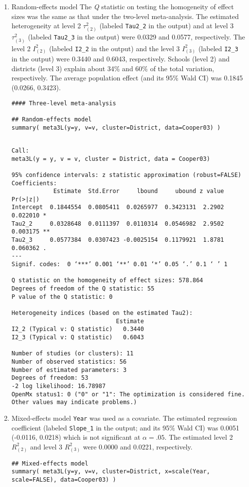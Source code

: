 \documentclass[11pt]{article}
\begin{document}
\begin{enumerate}
\item Random-effects model
\label{sec:org0d6bb7a}
The \emph{Q} statistic on testing the homogeneity of effect sizes was the same as that under the two-level meta-analysis. The estimated heterogeneity at level 2 \(\tau^2_{(2)}\) (labeled \texttt{Tau2\_2} in the output) and at level 3 \(\tau^2_{(3)}\) (labeled \texttt{Tau2\_3} in the output) were 0.0329 and 0.0577, respectively. The level 2 \(I^2_{(2)}\) (labeled \texttt{I2\_2} in the output) and the level 3 \(I^2_{(3)}\) (labeled \texttt{I2\_3} in the output) were 0.3440 and 0.6043, respectively. Schools (level 2) and districts (level 3) explain about 34\% and 60\% of the total variation, respectively. The average population effect (and its 95\% Wald CI) was 0.1845 (0.0266, 0.3423).
\begin{verbatim}
#### Three-level meta-analysis

## Random-effects model
summary( meta3L(y=y, v=v, cluster=District, data=Cooper03) )
\end{verbatim}

\begin{verbatim}

Call:
meta3L(y = y, v = v, cluster = District, data = Cooper03)

95% confidence intervals: z statistic approximation (robust=FALSE)
Coefficients:
            Estimate  Std.Error     lbound     ubound z value Pr(>|z|)   
Intercept  0.1844554  0.0805411  0.0265977  0.3423131  2.2902 0.022010 * 
Tau2_2     0.0328648  0.0111397  0.0110314  0.0546982  2.9502 0.003175 **
Tau2_3     0.0577384  0.0307423 -0.0025154  0.1179921  1.8781 0.060362 . 
---
Signif. codes:  0 ‘***’ 0.001 ‘**’ 0.01 ‘*’ 0.05 ‘.’ 0.1 ‘ ’ 1

Q statistic on the homogeneity of effect sizes: 578.864
Degrees of freedom of the Q statistic: 55
P value of the Q statistic: 0

Heterogeneity indices (based on the estimated Tau2):
                              Estimate
I2_2 (Typical v: Q statistic)   0.3440
I2_3 (Typical v: Q statistic)   0.6043

Number of studies (or clusters): 11
Number of observed statistics: 56
Number of estimated parameters: 3
Degrees of freedom: 53
-2 log likelihood: 16.78987 
OpenMx status1: 0 ("0" or "1": The optimization is considered fine.
Other values may indicate problems.)
\end{verbatim}

\item Mixed-effects model
\label{sec:org017f21d}
\texttt{Year} was used as a covariate. The estimated regression coefficient (labeled \texttt{Slope\_1} in the output; and its 95\% Wald CI) was 0.0051 (-0.0116, 0.0218) which is not significant at \(\alpha=.05\). The estimated level 2 \(R^2_{(2)}\) and level 3 \(R^2_{(3)}\) were 0.0000 and 0.0221, respectively.
\begin{verbatim}
## Mixed-effects model
summary( meta3L(y=y, v=v, cluster=District, x=scale(Year, scale=FALSE), data=Cooper03) )
\end{verbatim}


\end{enumerate}
\end{document}
